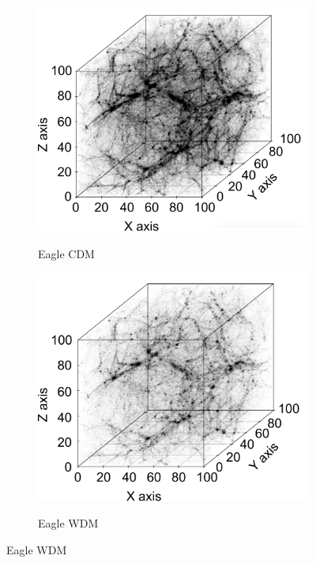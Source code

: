 \documentclass[12pt]{article}
\begin{document}
\begin{figure}[htp!]
  \centering
  \begin{subfigure}{0.24\textwidth}
    \caption{Eagle CDM}
    \includegraphics[width=\linewidth]{wdmfig.pdf}
    \label{fig:eagleDiagsA}
  \end{subfigure}
  \begin{subfigure}{0.24\textwidth}
    \caption{Eagle WDM}
    \includegraphics[width=\linewidth]{cdmfig.pdf}
    \label{fig:eagleDiagsB}
  \end{subfigure}

\end{figure}
\end{document}
